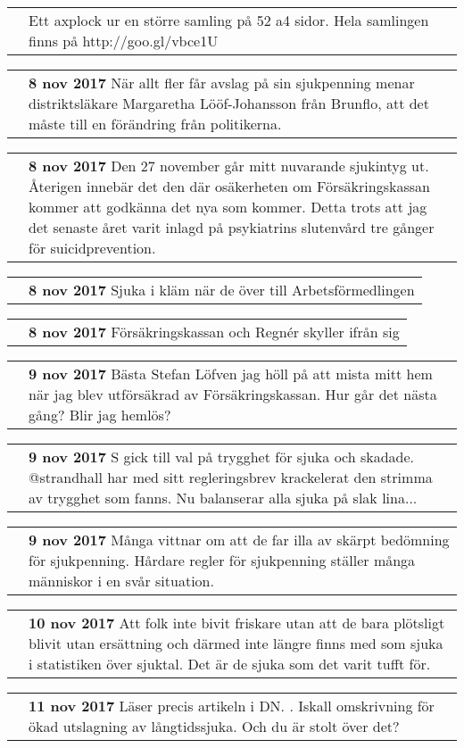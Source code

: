 \documentclass[12pt,a4paper,twocolumn]{article}
\newcommand{\entry}[3]{
\begin{tabular*}{\linewidth}{l m{\linewidth-1.5cm}}
\qrcode[height=1cm]{#3} & \textbf{#1} #2
\end{tabular*}
}
\begin{document}
\small
\entry{}{Ett axplock ur en större samling på 52 a4 sidor. Hela samlingen finns på http://goo.gl/vbce1U}{http://goo.gl/vbce1U}


\entry{8 nov 2017}{\say{Sjuka ska ha rätt att vara sjukskrivna} När allt fler får avslag på sin sjukpenning menar distriktsläkare Margaretha Lööf-Johansson från Brunflo, att det måste till en förändring från politikerna.}{https://goo.gl/dfHkrs}

\entry{8 nov 2017}{Den 27 november går mitt nuvarande sjukintyg ut. Återigen innebär det den där osäkerheten om Försäkringskassan kommer att godkänna det nya som kommer.
Detta trots att jag det senaste året varit inlagd på psykiatrins slutenvård tre gånger för suicidprevention.}{https://goo.gl/j8EenH}

\entry{8 nov 2017}{Sjuka i kläm när de \say{bollas} över till Arbetsförmedlingen}{https://goo.gl/SA4yKe}

\entry{8 nov 2017}{Försäkringskassan och Regnér skyller ifrån sig}{https://goo.gl/Xj3BCF}

\entry{9 nov 2017}{Bästa Stefan Löfven jag höll på att mista mitt hem när jag blev utförsäkrad av Försäkringskassan. Hur går det nästa gång? Blir jag hemlös?}{https://goo.gl/pD3ZDb}

\entry{9 nov 2017}{S gick till val på trygghet för sjuka och skadade.  @strandhall har med sitt regleringsbrev krackelerat den strimma av trygghet som fanns. Nu balanserar alla sjuka på slak lina...}{https://goo.gl/xeiPKW}

\entry{9 nov 2017}{Många vittnar om att de far illa av skärpt bedömning för sjukpenning. Hårdare regler för sjukpenning ställer många människor i en svår situation.}{https://goo.gl/kWDGLH}

\entry{10 nov 2017}{Att folk inte bivit friskare utan att de bara plötsligt blivit utan ersättning och därmed inte längre finns med som sjuka i statistiken över sjuktal. Det är de sjuka som det varit tufft för.}{https://goo.gl/WGmwRC}

\entry{11 nov 2017}{Läser precis artikeln i DN. \say{Vänt utvecklingen med sjukskrivningskostnaderna}. Iskall omskrivning för ökad utslagning av långtidssjuka. Och du är stolt över det?}{https://goo.gl/xsaRB7}
\end{document}
